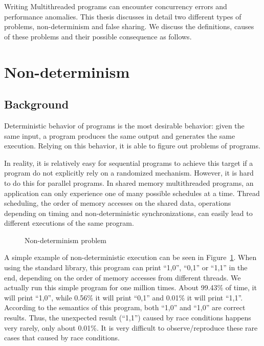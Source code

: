 \label{chapter:problems}

Writing Multithreaded programs can encounter concurrency errors and performance anomalies. This thesis discusses in detail two different types of problems, non-determinism and false sharing.  We discuss the definitions, causes of these problems and their possible consequence as follows.

\section{Non-determinism}
\label{sec:nondeterminism}

\subsection{Background}
Deterministic behavior of programs is the most desirable behavior: given the same input, a program
produces the same output and generates the same execution. Relying on this behavior, it is able to figure out problems of programs. 

In reality, it is relatively easy for sequential programs to achieve this target if a program do not explicitly rely on a randomized mechanism. 
However, it is hard to do this for parallel programs. In shared memory multithreaded programs, an application can only experience one of many possible 
schedules at a time. Thread scheduling, the order of memory accesses on the shared data, operations depending on timing and non-deterministic synchronizations, can easily lead to different executions of the same program.


\begin{figure}[!ht]
{\centering
\fbox{
\subfigure{}
\hspace{20pt}
\subfigure{}
\hspace{20pt}
\subfigure{}
}
\caption{Non-determinism problem 
\label{fig:nondeterminism}}
}
\end{figure}

A simple example of non-deterministic execution can be seen in Figure~\ref{fig:nondeterminism}. When using the standard \pthreads{} library, this program can print ``1,0'', ``0,1'' or ``1,1'' in the end, depending on the order of memory accesses from different threads. We actually run this simple program for one million times. About 99.43\% of time, it will print ``1,0'', while 0.56\% it will print ``0,1'' and 0.01\% it will print ``1,1''. According to the semantics of this program, both ``1,0'' and ``1,0'' are correct results. Thus, the unexpected result (``1,1'') caused by race conditions happens very rarely, only about 0.01\%.  
It is very difficult to observe/reproduce these rare cases that caused by race conditions.

